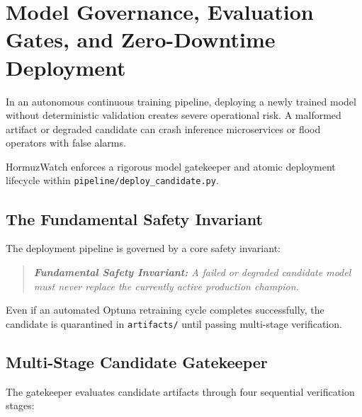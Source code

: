 \section{Model Governance, Evaluation Gates, and Zero-Downtime Deployment}
\label{sec:model_governance}

In an autonomous continuous training pipeline, deploying a newly trained model without deterministic validation creates severe operational risk. A malformed artifact or degraded candidate can crash inference microservices or flood operators with false alarms.

HormuzWatch enforces a rigorous model gatekeeper and atomic deployment lifecycle within \texttt{pipeline/deploy\_candidate.py}.

\subsection{The Fundamental Safety Invariant}
The deployment pipeline is governed by a core safety invariant:
\begin{quote}
\textit{\textbf{Fundamental Safety Invariant:} A failed or degraded candidate model must never replace the currently active production champion.}
\end{quote}
Even if an automated Optuna retraining cycle completes successfully, the candidate is quarantined in \texttt{artifacts/} until passing multi-stage verification.

\subsection{Multi-Stage Candidate Gatekeeper}
The gatekeeper evaluates candidate artifacts through four sequential verification stages:

